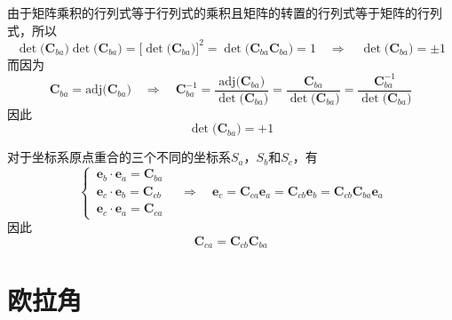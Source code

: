 \vspace*{0.5em}
\sssection[坐标变换矩阵的行列式为1]

由于矩阵乘积的行列式等于行列式的乘积且矩阵的转置的行列式等于矩阵的行列式，所以
\begin{equation}
	\det \big(\bm{C}_{ba}\big) \det \big(\bm{C}_{ba}\big) 
	= \big[ \det \big(\bm{C}_{ba} \big) \big]^2 
	= \det \big( \bm{C}_{ba} \bm{C}_{ba} \big) 
	= 1
	\quad \Rightarrow \quad 
	\det \big(\bm{C}_{ba}\big) = \pm 1
\end{equation}
而因为
\begin{equation*}
	\bm{C}_{ba} = \text{adj}\big( \bm{C}_{ba} \big) 
	\quad  \Rightarrow \quad 
	\bm{C}_{ba}^{-1} 
	= \dfrac{\text{adj}\big( \bm{C}_{ba} \big)}{\det \big( \bm{C}_{ba} \big)} 
	= \dfrac{\bm{C}_{ba}}{\det \big( \bm{C}_{ba} \big)} 
	= \dfrac{\bm{C}_{ba}^{-1}}{\det \big( \bm{C}_{ba} \big)}
\end{equation*}
因此
\begin{equation}
	\det \big( \bm{C}_{ba} \big) = + 1
\end{equation}
\vspace*{0.5em}


\sssection[相继运动的坐标变换矩阵]

对于坐标系原点重合的三个不同的坐标系$S_a$，$S_b$和$S_c$，有
\begin{equation*}
	\begin{cases}
		\, \bm{e}_b \cdot \bm{e}_a = \bm{C}_{ba} \\
		\, \bm{e}_c \cdot \bm{e}_b = \bm{C}_{cb} \\
		\, \bm{e}_c \cdot \bm{e}_a = \bm{C}_{ca}
	\end{cases}
	\quad \Rightarrow \quad 
	\bm{e}_c = \bm{C}_{ca} \bm{e}_a = \bm{C}_{cb}\bm{e}_b = \bm{C}_{cb} \bm{C}_{ba} \bm{e}_{a}
\end{equation*}
因此
\begin{equation}
	\bm{C}_{ca} = \bm{C}_{cb} \bm{C}_{ba}
\end{equation}



\section{欧拉角}
\vspace*{-1em}


